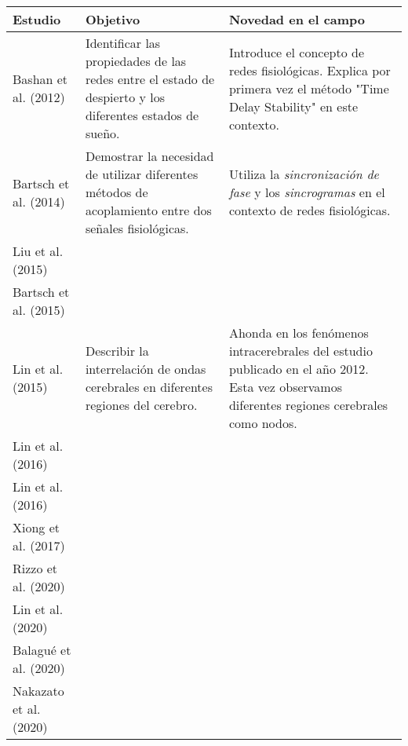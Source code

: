 \documentclass[twoside,twocolumn]{article}
\begin{document}
\onecolumn
\begin{center}
  \begin{table}[t]
    \begin{tabular}{|p{4cm}p{6cm}p{5cm}|}
      \hline
      Estudio & Objetivo & Novedad en el campo \\
      \hline
      Bashan et al. (2012) \cite{bashan2012network} &
      Identificar las propiedades de las redes entre el estado de despierto y los diferentes estados de sueño.
      &
      Introduce el concepto de redes fisiológicas. Explica por primera vez el método "Time Delay Stability" en este contexto.
      \\ \hline
      Bartsch et al. (2014)\cite{bartsch2014coexisting} &
      Demostrar la necesidad de utilizar diferentes métodos de acoplamiento entre dos señales fisiológicas.
      &
      Utiliza la \textit{sincronización de fase} y los \textit{sincrogramas} en el contexto de redes fisiológicas.
      \\ \hline
      Liu et al. (2015)\cite{liu2015major} &
      &
      \\ \hline
      Bartsch et al. (2015)\cite{bartsch2015network} &
      &
      \\ \hline
      Lin et al. (2015) \cite{2015Plasticity} &
      Describir la interrelación de ondas cerebrales en diferentes regiones del cerebro.
      &
      Ahonda en los fenómenos intracerebrales del estudio publicado en el año 2012. Esta vez observamos diferentes regiones cerebrales como nodos.
      \\ \hline
      Lin et al. (2016)\cite{lin2016delay} &
      &
      \\ \hline
      Lin et al. (2016)\cite{ivanov2016focus} &
      &
      \\ \hline
      Xiong et al. (2017)\cite{xiong2017entropy} &
      &
      \\ \hline
      Rizzo et al. (2020)\cite{rizzo2020network} &
      &
      \\ \hline
      Lin et al. (2020)\cite{lin2020dynamic} &
      &
      \\ \hline
      Balagué et al. (2020)\cite{balague2020network} &
      &
      \\ \hline
      Nakazato et al. (2020)\cite{nakazato2020estimation} &
      &
      \\ \hline

\end{tabular}
\end{table}
\end{center}
\end{document}
